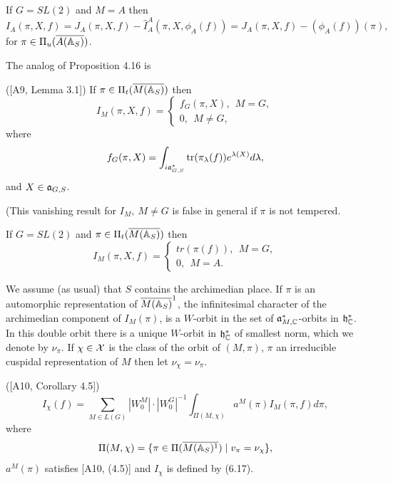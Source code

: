 \begin{example}
If $G=SL(2)$ and $M=A$ then
\[
I_A(\pi,X,f)
=J_A(\pi,X,f)-
\hat{I}_A^A(\pi,X,\phi_A(f))
=J_A(\pi,X,f)-(\phi_A(f))(\pi),
\]
for $\pi\in \Pi_u(\overline{A({\Bbb{A}}_S)})$.
\end{example}

The analog of Proposition 4.16 is

\begin{proposition}
([A9, Lemma 3.1]) If $\pi\in\Pi_t(\overline{M({\Bbb{A}}_S)})$ then
\[
I_M(\pi,X,f)=
\left\{
\begin{array}{c}
 f_G(\pi,X),\ \ M=G,\\
 0,\ \ M\not= G,
\end{array}
\right.
\]
where
\[
f_G(\pi,X)=
\int_{i{\frak{a}}^*_{G,S}}
{\rm tr}(\pi_\lambda(f))e^{\lambda(X)}d\lambda,
\]
and $X\in {\frak{a}}_{G,S}$.
\end{proposition}

(This vanishing result for $I_M,\ M\not=G$ is false in
general if $\pi$ is not tempered.

\begin{example} If $G=SL(2)$ and
$\pi\in\Pi_t(\overline{M({\Bbb{A}}_S)})$ then
\[
I_M(\pi,X,f)=
\left\{
\begin{array}{c}
 tr(\pi(f)),\ \ M=G,\\
 0,\ \ M= A.
\end{array}
\right.
\]
\end{example}

We assume (as usual) that $S$ contains the archimedian place.
If $\pi$ is an automorphic representation of $\overline{M({\Bbb{A}}_S)}^1$,
the infinitesimal character of the archimedian
component of $I_M(\pi)$, is a $W$-orbit in the set of
${\frak{a}}_{M,{\Bbb{C}}}^*$-orbits in ${\frak{h}}_{\Bbb{C}}^*$.
In this double orbit there is a unique
$W$-orbit in ${\frak{h}}_{\Bbb{C}}^*$ of smallest norm, which we denote by
$\nu_\pi$. If $\chi\in {\cal{X}}$ is the class of the orbit of
$(M,\pi)$, $\pi$ an
irreducible cuspidal representation of $M$ then let
$\nu_\chi =\nu_\pi$.

\begin{theorem} ([A10, Corollary 4.5]) 
\[
I_\chi
(f)
=\sum_{M\in L(G)}|W_0^M|\cdot |W_0^G|^{-1}
\int_{\Pi (M,\chi)}a^M(\pi
)I_M(\pi ,f)d\pi ,
\]
where 
\[
\Pi (M,\chi )=
\{\pi \in \Pi (\overline{M({\Bbb{A}}_S)^1})\;|\;v_\pi =\nu_\chi \},
\]
$a^M(\pi )$ satisfies [A10, (4.5)] and $I_\chi$ is
defined by (6.17).
\end{theorem}

